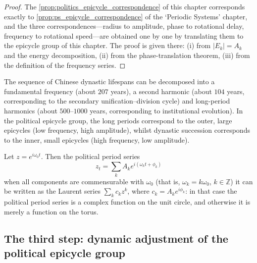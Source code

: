 \begin{proof}
The \cref{prop:politics_epicycle_correspondence} of this chapter corresponds exactly to \cref{prop:ps_epicycle_correspondence} of the `Periodic Systems' chapter,
and the three correspondences---radius to amplitude, phase to rotational delay, frequency to rotational speed---are obtained one by one by translating them to the epicycle group of this chapter.
The proof is given there: (i) from $|E_k|=A_k$ and the energy decomposition, (ii) from the phase-translation theorem, (iii) from the definition of the frequency series.
\end{proof}

\begin{example}\label{ex:politics_series_example}
The sequence of Chinese dynastic lifespans can be decomposed into a fundamental frequency (about $207$ years), a second harmonic (about $104$ years, corresponding to the secondary unification--division cycle) and long-period harmonics (about $500$--$1000$ years, corresponding to institutional evolution). In the political epicycle group, the long periods correspond to the outer, large epicycles (low frequency, high amplitude), whilst dynastic succession corresponds to the inner, small epicycles (high frequency, low amplitude).
\end{example}

\begin{remark}\label{rem:politics_series_complex}
Let $z=e^{i\omega_0t}$. Then the political period series
\[
z_t=\sum_k A_k e^{i(\omega_k t+\phi_k)}
\]
when all components are commensurable with $\omega_0$ (that is, $\omega_k=k\omega_0$, $k\in\mathbb Z$) it can be written as the Laurent series $\sum_k c_k z^k$, where $c_k=A_k e^{i\phi_k}$: in that case the political period series is a complex function on the unit circle, and otherwise it is merely a function on the torus.
\end{remark}

\subsection{The third step: dynamic adjustment of the political epicycle group}

